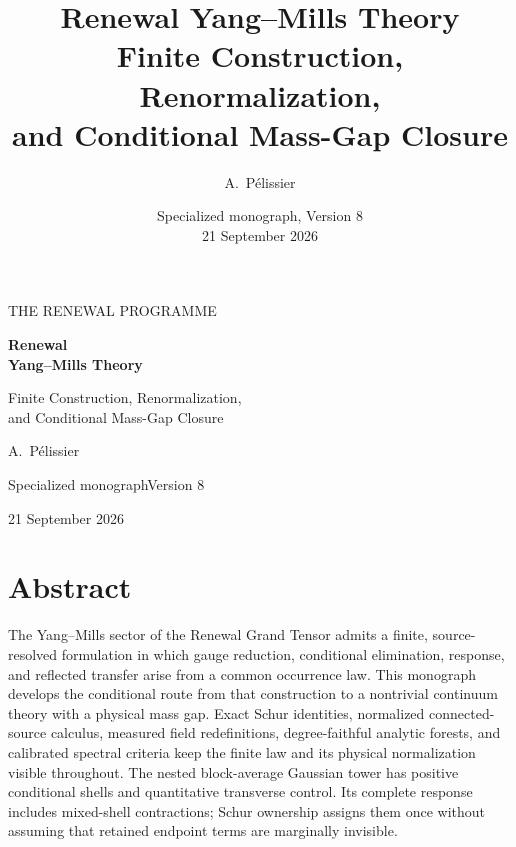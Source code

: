 \documentclass[11pt,oneside,openany]{book}
\title{\textbf{Renewal Yang--Mills Theory}\\[0.55em]\Large Finite Construction, Renormalization,\\and Conditional Mass-Gap Closure}
\author{A.~P\'elissier}
\date{Specialized monograph, Version 8\\21 September 2026}
\theoremstyle{definition}
\theoremstyle{remark}
\begin{document}
\frontmatter
\begin{titlepage}
\centering
\vspace*{25mm}
{\small THE RENEWAL PROGRAMME\par}
\vspace{15mm}
{\Huge\bfseries Renewal\\[3mm]Yang--Mills Theory\par}
\vspace{12mm}
{\Large Finite Construction, Renormalization,\\[2mm]and Conditional Mass-Gap Closure\par}
\vspace{20mm}
{\large A.~P\'elissier\par}
\vfill
{\normalsize Specialized monograph\quad\textbar\quad Version 8\par}
\vspace{3mm}
{\normalsize 21 September 2026\par}
\end{titlepage}
\chapter*{Abstract}
The Yang--Mills sector of the Renewal Grand Tensor admits a finite,
source-resolved formulation in which gauge reduction, conditional
elimination, response, and reflected transfer arise from a common
occurrence law. This monograph develops the conditional route from
that construction to a nontrivial continuum theory with a physical
mass gap. Exact Schur identities, normalized connected-source calculus,
measured field redefinitions, degree-faithful analytic forests, and
calibrated spectral criteria keep the finite law and its physical
normalization visible throughout. The nested block-average Gaussian
tower has positive conditional shells and quantitative transverse
control. Its complete response includes mixed-shell contractions;
Schur ownership assigns them once without assuming that retained
endpoint terms are marginally invisible.
\end{document}
